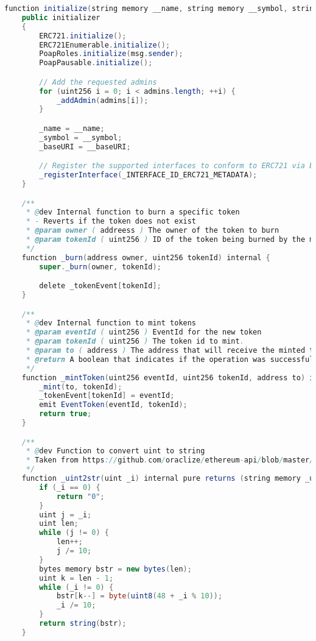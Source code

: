 \documentclass[MSE,Master,english]{twbook}%
\begin{document}
\begin{lstlisting}[language=Java, name={POAP Smart Contract}, label={sc:poapContract}]
    function initialize(string memory __name, string memory __symbol, string memory __baseURI, address[] memory admins)
    public initializer
    {
        ERC721.initialize();
        ERC721Enumerable.initialize();
        PoapRoles.initialize(msg.sender);
        PoapPausable.initialize();

        // Add the requested admins
        for (uint256 i = 0; i < admins.length; ++i) {
            _addAdmin(admins[i]);
        }

        _name = __name;
        _symbol = __symbol;
        _baseURI = __baseURI;

        // Register the supported interfaces to conform to ERC721 via ERC165
        _registerInterface(_INTERFACE_ID_ERC721_METADATA);
    }

    /**
     * @dev Internal function to burn a specific token
     * - Reverts if the token does not exist
     * @param owner ( addreess ) The owner of the token to burn
     * @param tokenId ( uint256 ) ID of the token being burned by the msg.sender
     */
    function _burn(address owner, uint256 tokenId) internal {
        super._burn(owner, tokenId);

        delete _tokenEvent[tokenId];
    }

    /**
     * @dev Internal function to mint tokens
     * @param eventId ( uint256 ) EventId for the new token
     * @param tokenId ( uint256 ) The token id to mint.
     * @param to ( address ) The address that will receive the minted tokens.
     * @return A boolean that indicates if the operation was successful.
     */
    function _mintToken(uint256 eventId, uint256 tokenId, address to) internal returns (bool) {
        _mint(to, tokenId);
        _tokenEvent[tokenId] = eventId;
        emit EventToken(eventId, tokenId);
        return true;
    }

    /**
     * @dev Function to convert uint to string
     * Taken from https://github.com/oraclize/ethereum-api/blob/master/oraclizeAPI_0.5.sol
     */
    function _uint2str(uint _i) internal pure returns (string memory _uintAsString) {
        if (_i == 0) {
            return "0";
        }
        uint j = _i;
        uint len;
        while (j != 0) {
            len++;
            j /= 10;
        }
        bytes memory bstr = new bytes(len);
        uint k = len - 1;
        while (_i != 0) {
            bstr[k--] = byte(uint8(48 + _i % 10));
            _i /= 10;
        }
        return string(bstr);
    }


\end{lstlisting}
\end{document}
